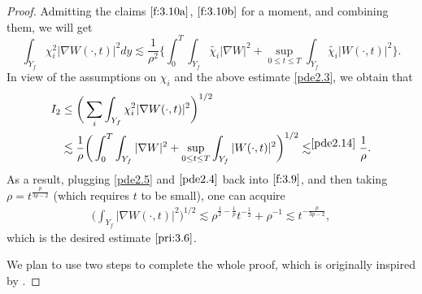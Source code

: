 \documentclass[13pt,CJK]{article}
\theoremstyle{plain}                       %
\theoremstyle{remark}
\numberwithin{equation}{section}
\begin{document}
\begin{proof}
Admitting the claims $\eqref{f:3.10a}$, $\eqref{f:3.10b}$ for a moment, and combining them,  we will get
\begin{equation}\label{pde2.3}
\int_{Y_f}\chi_i^2|\nabla W(\cdot,t)|^2dy\lesssim
\frac{1}{\rho^2}\bigg\{\int_{0}^{T}\int_{Y_f}
\tilde{\chi_i}|\nabla W|^2+
\sup_{0\leq t\leq T}\int_{Y_f}
  \tilde{\chi_i}|W(\cdot,t)|^2\bigg\}.
\end{equation}
In view of the assumptions on $\chi_i$ and the above estimate \eqref{pde2.3}, we obtain that
\begin{equation}\label{pde2.4}
 \begin{aligned}
 I_2&\leq\bigg(\sum_i\int_{Y_f}\chi_i^2|\nabla W(\cdot,t)|^2\bigg)^{1/2}\\
 &\lesssim \frac{1}{\rho}\bigg(
 \int_{0}^{T}\int_{Y_f}|\nabla W|^2+\sup_{0\leq t\leq T}\int_{Y_f}
 |W(\cdot,t)|^2 \bigg)^{1/2}\lesssim^{\eqref{pde2.14}} \frac{1}{\rho}.
 \end{aligned}
\end{equation}
As a result, plugging \eqref{pde2.5} and $\eqref{pde2.4}$ back into $\eqref{f:3.9}$, and then taking $\rho=t^{\frac{p}{3p-2}}$ (which
requires $t$ to be small), one can acquire
\begin{equation*}
\begin{aligned}
\bigg(\int_{Y_f}|\nabla W(\cdot,t)|^2\bigg)^{1/2}
\lesssim \rho^{\frac{1}{2}-\frac{1}{p}}t^{-\frac{1}{2}}
+\rho^{-1}
\lesssim t^{-\frac{p}{3p-2}},
\end{aligned}
\end{equation*}
which is the desired estimate $\eqref{pri:3.6}$.


We plan to use two steps to complete the whole proof, which is originally inspired by \cite{Jin13}.



\end{proof}
\end{document}
